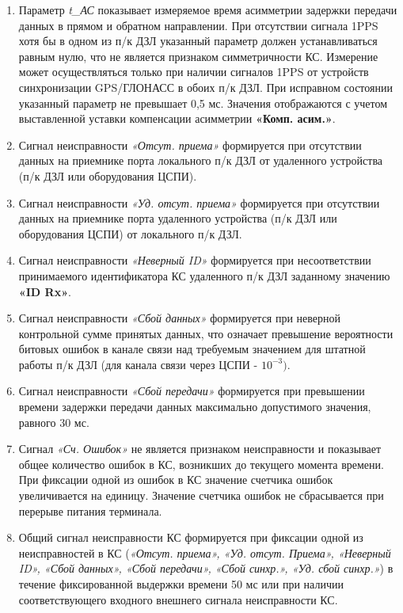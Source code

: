 \begin{enumerate}
\begin{enumerate}
\item Параметр \textit{t\_АС} показывает измеряемое время асимметрии задержки передачи данных в прямом и обратном направлении. При отсутствии сигнала 1PPS хотя бы в одном из п/к ДЗЛ указанный параметр должен устанавливаться равным нулю, что не является признаком симметричности КС. Измерение может осуществляться только при наличии сигналов 1PPS от устройств синхронизации GPS/ГЛОНАСС в обоих п/к ДЗЛ. При исправном состоянии указанный параметр не превышает 0,5 мс. Значения отображаются с учетом выставленной уставки компенсации асимметрии \textbf{«Комп. асим.»}.
\item Сигнал неисправности \textit{«Отсут. приема»} формируется при отсутствии данных на приемнике порта локального п/к ДЗЛ от удаленного устройства (п/к ДЗЛ или оборудования ЦСПИ).
\item Сигнал неисправности \textit{«Уд. отсут. приема»} формируется при отсутствии данных на приемнике порта удаленного устройства (п/к ДЗЛ или оборудования ЦСПИ) от локального п/к ДЗЛ.
\item Сигнал неисправности \textit{«Неверный ID»} формируется при несоответствии принимаемого идентификатора КС удаленного п/к ДЗЛ заданному значению \textbf{«ID Rx»}.
\item Сигнал неисправности \textit{«Сбой данных»} формируется при неверной контрольной сумме принятых данных, что означает превышение вероятности битовых ошибок в канале связи над требуемым значением для штатной работы п/к ДЗЛ (для канала связи через ЦСПИ - $ 10^{-3}) $.
\item Сигнал неисправности \textit{«Сбой передачи»} формируется при превышении времени задержки передачи данных максимально допустимого значения, равного 30 мс.
\item Сигнал \textit{«Сч. Ошибок»} не является признаком неисправности и показывает общее количество ошибок в КС, возникших до текущего момента времени. При фиксации одной из ошибок в КС значение счетчика ошибок увеличивается на единицу. Значение счетчика ошибок не сбрасывается при перерыве питания терминала.
\item Общий сигнал неисправности КС формируется при фиксации одной из неисправностей в КС (\textit{«Отсут. приема», «Уд. отсут. Приема», «Неверный ID», «Сбой данных», «Сбой передачи», «Сбой синхр.», «Уд. сбой синхр.»}) в течение фиксированной выдержки времени 50 мс или при наличии соответствующего входного внешнего сигнала неисправности КС.
\end{enumerate}

\end{enumerate}